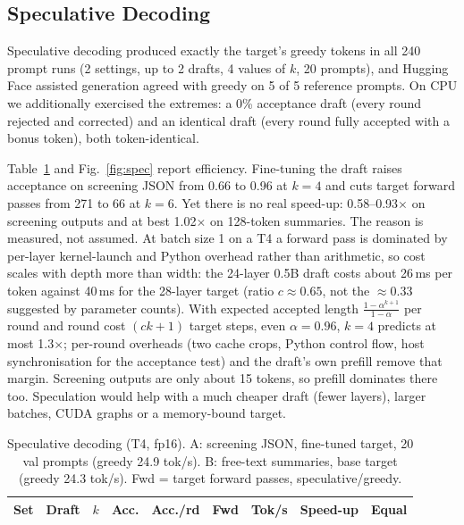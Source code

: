 \documentclass[conference]{IEEEtran}
\begin{document}
\subsection{Speculative Decoding}
Speculative decoding produced exactly the target's greedy tokens in all 240 prompt runs (2 settings, up to 2 drafts, 4 values of $k$, 20 prompts), and Hugging Face assisted generation agreed with greedy on 5 of 5 reference prompts. On CPU we additionally exercised the extremes: a 0\% acceptance draft (every round rejected and corrected) and an identical draft (every round fully accepted with a bonus token), both token-identical.

Table~\ref{tab:spec} and Fig.~\ref{fig:spec} report efficiency. Fine-tuning the draft raises acceptance on screening JSON from 0.66 to 0.96 at $k{=}4$ and cuts target forward passes from 271 to 66 at $k{=}6$. Yet there is no real speed-up: 0.58--0.93$\times$ on screening outputs and at best 1.02$\times$ on 128-token summaries. The reason is measured, not assumed. At batch size 1 on a T4 a forward pass is dominated by per-layer kernel-launch and Python overhead rather than arithmetic, so cost scales with depth more than width: the 24-layer 0.5B draft costs about 26\,ms per token against 40\,ms for the 28-layer target (ratio $c\approx0.65$, not the $\approx0.33$ suggested by parameter counts). With expected accepted length $\frac{1-\alpha^{k+1}}{1-\alpha}$ per round and round cost $(ck+1)$ target steps, even $\alpha=0.96$, $k=4$ predicts at most 1.3$\times$; per-round overheads (two cache crops, Python control flow, host synchronisation for the acceptance test) and the draft's own prefill remove that margin. Screening outputs are only about 15 tokens, so prefill dominates there too. Speculation would help with a much cheaper draft (fewer layers), larger batches, CUDA graphs or a memory-bound target.

\begin{table}[t]
\centering
\caption{Speculative decoding (T4, fp16). A: screening JSON, fine-tuned target, 20 val prompts (greedy 24.9 tok/s). B: free-text summaries, base target (greedy 24.3 tok/s). Fwd = target forward passes, speculative/greedy.}
\label{tab:spec}
\setlength{\tabcolsep}{2pt}
\footnotesize
\begin{tabular}{llccccccc}
\toprule
Set & Draft & $k$ & Acc. & Acc./rd & Fwd & Tok/s & Speed-up & Equal \\
\midrule

\bottomrule
\end{tabular}
\end{table}
\end{document}

